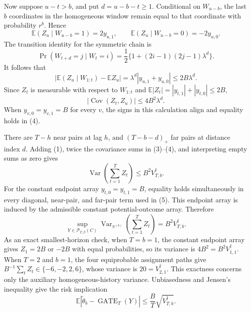 Now suppose \(u-t>b\), and put \(d=u-b-t\ge1\). Conditional on \(W_{u-b}\), the last \(b\) coordinates in the homogeneous window remain equal to that coordinate with probability \(r^b\). Hence
\[
\mathbb E(Z_u\mid W_{u-b}=1)=2y_{u,1},
\qquad
\mathbb E(Z_u\mid W_{u-b}=0)=-2y_{u,0}.
\]
The transition identity for the symmetric chain is
\[
\Pr(W_{t+d}=j\mid W_t=i)
=\frac12\{1+(2i-1)(2j-1)\lambda^d\}.
\]
It follows that
\[
\left|\mathbb E(Z_u\mid W_{1:t})-\mathbb EZ_u\right|
=\lambda^d|y_{u,1}+y_{u,0}|
\le2B\lambda^d.
\]
Since \(Z_t\) is measurable with respect to \(W_{1:t}\) and \(\mathbb E|Z_t|=|y_{t,1}|+|y_{t,0}|\le2B\),
\[
|\operatorname{Cov}(Z_t,Z_u)|\le4B^2\lambda^d.
\tag{4}
\]
When \(y_{v,0}=y_{v,1}=B\) for every \(v\), the signs in this calculation align and equality holds in (4).

There are \(T-h\) near pairs at lag \(h\), and \((T-b-d)_+\) far pairs at distance index \(d\). Adding (1), twice the covariance sums in (3)--(4), and interpreting empty sums as zero gives
\[
\operatorname{Var}\left(\sum_{t=1}^T Z_t\right)
\le B^2V_{T,b}^{\dagger}.
\tag{5}
\]
For the constant endpoint array \(y_{t,0}=y_{t,1}=B\), equality holds simultaneously in every diagonal, near-pair, and far-pair term used in (5). This endpoint array is induced by the admissible constant potential-outcome array. Therefore
\[
\sup_{Y\in\mathcal P_{T,\beta}(C)}
\operatorname{Var}_{\pi^{(b)}}\left(\sum_{t=1}^T Z_t\right)
=B^2V_{T,b}^{\dagger}.
\tag{6}
\]
As an exact smallest-horizon check, when \(T=b=1\), the constant endpoint array gives \(Z_1=2B\) or \(-2B\) with equal probabilities, so its variance is \(4B^2=B^2V_{1,1}^{\dagger}\). When \(T=2\) and \(b=1\), the four equiprobable assignment paths give \(B^{-1}\sum_tZ_t\in\{-6,-2,2,6\}\), whose variance is \(20=V_{2,1}^{\dagger}\). This exactness concerns only the auxiliary homogeneous-history variance. Unbiasedness and Jensen's inequality give the risk implication
\[
\mathbb E\left|\widetilde\theta_b-\operatorname{GATE}_T(Y)\right|
\le\frac BT\sqrt{V_{T,b}^{\dagger}}.
\tag{7}
\]


